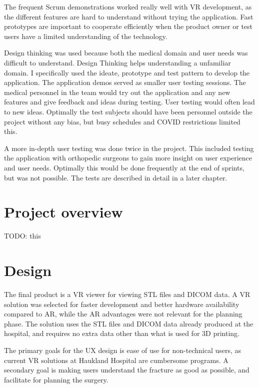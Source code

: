 \documentclass[a4paper]{report}
\begin{document}
The frequent Scrum demonstrations worked really well with VR development, as the different features are hard to understand without trying the application. Fast prototypes are important to cooperate efficiently when the product owner or test users have a limited understanding of the technology.


Design thinking was used because both the medical domain and user needs was difficult to understand. Design Thinking helps understanding a unfamiliar domain. I specifically used the ideate, prototype and test pattern to develop the application.
The application demos served as smaller user testing sessions. The medical personnel in the team would try out the application and any new features and give feedback and ideas during testing. User testing would often lead to new ideas. Optimally the test subjects should have been personnel outside the project without any bias, but busy schedules and COVID restrictions limited this.

A more in-depth user testing was done twice in the project. This included testing the application with orthopedic surgeons to gain more insight on user experience and user needs. Optimally this would be done frequently at the end of sprints, but was not possible. The tests are described in detail in a later chapter.

\section{Project overview}\label{CodeStructure}
TODO: this

\section{Design}


The final product is a VR viewer for viewing STL files and DICOM data. A VR solution was selected for faster development and better hardware availability compared to AR, while the AR advantages were not relevant for the planning phase.
The solution uses the STL files and DICOM data already produced at the hospital, and requires no extra data other than what is used for 3D printing.

The primary goals for the UX design is ease of use for non-technical users, as current VR solutions at Haukland Hospital are cumbersome programs.
A secondary goal is making users understand the fracture as good as possible, and facilitate for planning the surgery.
\end{document}
